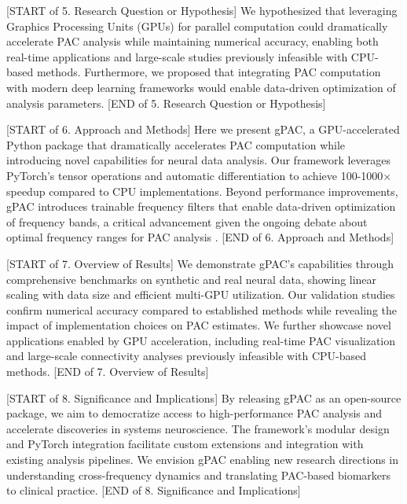 [START of 5. Research Question or Hypothesis]
We hypothesized that leveraging Graphics Processing Units (GPUs) for parallel computation could dramatically accelerate PAC analysis while maintaining numerical accuracy, enabling both real-time applications and large-scale studies previously infeasible with CPU-based methods. Furthermore, we proposed that integrating PAC computation with modern deep learning frameworks would enable data-driven optimization of analysis parameters.
[END of 5. Research Question or Hypothesis]

[START of 6. Approach and Methods]
Here we present gPAC, a GPU-accelerated Python package that dramatically accelerates PAC computation while introducing novel capabilities for neural data analysis. Our framework leverages PyTorch's tensor operations and automatic differentiation to achieve 100-1000× speedup compared to CPU implementations. Beyond performance improvements, gPAC introduces trainable frequency filters that enable data-driven optimization of frequency bands, a critical advancement given the ongoing debate about optimal frequency ranges for PAC analysis \citep{Aru2015}.
[END of 6. Approach and Methods]

[START of 7. Overview of Results]
We demonstrate gPAC's capabilities through comprehensive benchmarks on synthetic and real neural data, showing linear scaling with data size and efficient multi-GPU utilization. Our validation studies confirm numerical accuracy compared to established methods while revealing the impact of implementation choices on PAC estimates. We further showcase novel applications enabled by GPU acceleration, including real-time PAC visualization and large-scale connectivity analyses previously infeasible with CPU-based methods.
[END of 7. Overview of Results]

[START of 8. Significance and Implications]
By releasing gPAC as an open-source package, we aim to democratize access to high-performance PAC analysis and accelerate discoveries in systems neuroscience. The framework's modular design and PyTorch integration facilitate custom extensions and integration with existing analysis pipelines. We envision gPAC enabling new research directions in understanding cross-frequency dynamics and translating PAC-based biomarkers to clinical practice.
[END of 8. Significance and Implications]